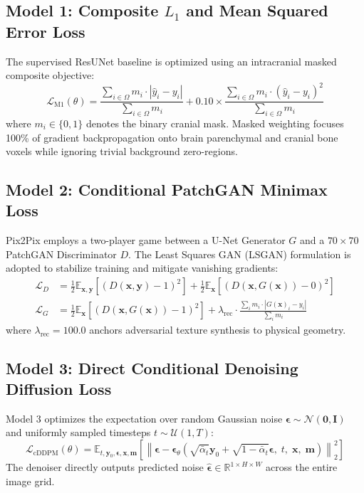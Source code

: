 \subsection{Model 1: Composite $L_1$ and Mean Squared Error Loss}
The supervised ResUNet baseline is optimized using an intracranial masked composite objective:
\begin{equation}
\mathcal{L}_{\text{M1}}(\theta) = \frac{\sum_{i \in \Omega} m_i \cdot |\hat{y}_i - y_i|}{\sum_{i \in \Omega} m_i} + 0.10 \times \frac{\sum_{i \in \Omega} m_i \cdot (\hat{y}_i - y_i)^2}{\sum_{i \in \Omega} m_i}
\label{eq:impl_m1_loss}
\end{equation}
where $m_i \in \{0, 1\}$ denotes the binary cranial mask. Masked weighting focuses 100\% of gradient backpropagation onto brain parenchymal and cranial bone voxels while ignoring trivial background zero-regions.

\subsection{Model 2: Conditional PatchGAN Minimax Loss}
Pix2Pix employs a two-player game between a U-Net Generator $G$ and a $70 \times 70$ PatchGAN Discriminator $D$. The Least Squares GAN (LSGAN) formulation is adopted to stabilize training and mitigate vanishing gradients:
\begin{align}
\mathcal{L}_D &= \frac{1}{2} \mathbb{E}_{\mathbf{x}, \mathbf{y}}\left[ (D(\mathbf{x}, \mathbf{y}) - 1)^2 \right] + \frac{1}{2} \mathbb{E}_{\mathbf{x}}\left[ (D(\mathbf{x}, G(\mathbf{x})) - 0)^2 \right] \label{eq:impl_d_loss} \\
\mathcal{L}_G &= \frac{1}{2} \mathbb{E}_{\mathbf{x}}\left[ (D(\mathbf{x}, G(\mathbf{x})) - 1)^2 \right] + \lambda_{\text{rec}} \cdot \frac{\sum_{i} m_i \cdot |G(\mathbf{x})_i - y_i|}{\sum_i m_i} \label{eq:impl_g_loss}
\end{align}
where $\lambda_{\text{rec}} = 100.0$ anchors adversarial texture synthesis to physical geometry.

\subsection{Model 3: Direct Conditional Denoising Diffusion Loss}
Model 3 optimizes the expectation over random Gaussian noise $\boldsymbol{\epsilon} \sim \mathcal{N}(\mathbf{0}, \mathbf{I})$ and uniformly sampled timesteps $t \sim \mathcal{U}(1, T)$:
\begin{equation}
\mathcal{L}_{\text{cDDPM}}(\theta) = \mathbb{E}_{t, \mathbf{y}_0, \boldsymbol{\epsilon}, \mathbf{x}, \mathbf{m}} \left[ \left\| \boldsymbol{\epsilon} - \boldsymbol{\epsilon}_\theta\left( \sqrt{\bar{\alpha}_t} \mathbf{y}_0 + \sqrt{1 - \bar{\alpha}_t} \boldsymbol{\epsilon}, \; t, \; \mathbf{x}, \; \mathbf{m} \right) \right\|_2^2 \right]
\label{eq:impl_m3_loss}
\end{equation}
The denoiser directly outputs predicted noise $\hat{\boldsymbol{\epsilon}} \in \mathbb{R}^{1 \times H \times W}$ across the entire image grid.

